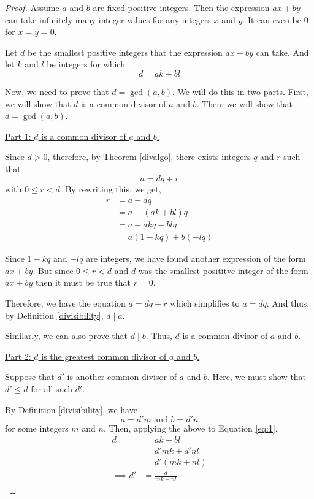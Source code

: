 \begin{proof}
	Assume $a$ and $b$ are fixed positive integers. Then the expression $ax+by$ can take infinitely many integer values for any integers $x$ and $y$. It can even be $0$ for $x = y = 0$. 

	Let $d$ be the smallest positive integers that the expression $ax+by$ can take. And let $k$ and $l$ be integers for which 
	\begin{equation} \label{eq:1}
		d = ak + bl
	\end{equation}

	Now, we need to prove that $d = \gcd(a,b)$. We will do this in two parts. First, we will show that $d$ is a common divisor of $a$ and $b$. Then, we will show that $d = \gcd(a,b)$.

	\underline{Part 1: $d$ is a common divisor of $a$ and $b$.}

	Since $d > 0$, therefore, by Theorem \ref{divalgo}, there exists integers $q$ and $r$ such that 
	$$a = dq + r$$
	with $0 \leq r < d$. By rewriting this, we get,
	$$
	\begin{align}
		r &= a - dq \\
			&= a - (ak+bl)q \\
			&= a - akq - blq \\
			&= a(1-kq) + b(-lq)
	\end{align}
	$$

	Since $1-kq$ and $-lq$ are integers, we have found another expression of the form $ax + by$. But since $0 \leq r < d$ and $d$ was the smallest posititve integer of the form $ax+by$ then it must be true that $r = 0$.

	Therefore, we have the equation $a = dq + r$ which simplifies to $a = dq$. And thus, by Definition \ref{divisibility}, $d \mid a$.

	Similarly, we can also prove that $d \mid b$.
	Thus, $d$ is a common divisor of $a$ and $b$.

	\bigbreak

	\underline{Part 2: $d$ is the greatest common divisor of $a$ and $b$.}

	Suppose that $d'$ is another common divisor of $a$ and $b$. Here, we must show that $d' \leq d$ for all such $d'$.
	
	By Definition \ref{divisibility}, we have $$a = d'm \text{ and } b = d'n$$
	for some integers $m$ and $n$. Then, applying the above to Equation \ref{eq:1}, 
	$$
	\begin{align}
		d &= ak + bl \\
			&= d'mk + d'nl \\
			&= d'(mk+nl) \\
		\implies d' &= \frac{d}{mk+nl}
	\end{align}
	$$


\end{proof}
